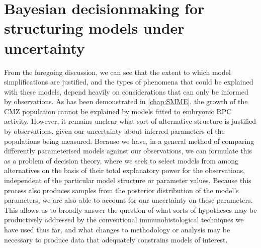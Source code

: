 \section{Bayesian decisionmaking for structuring models under uncertainty}
From the foregoing discussion, we can see that the extent to which model simplifications are justified, and the types of phenomena that could be explained with these models, depend heavily on considerations that can only be informed by observations. As has been demonstrated in \autoref{chap:SMME}, the growth of the CMZ population cannot be explained by models fitted to embryonic RPC activity. However, it remains unclear what sort of alternative structure is justified by observations, given our uncertainty about inferred parameters of the populations being measured. Because we have, in  a general method of comparing differently parameterised models against our observations, we can formulate this as a problem of decision theory, where we seek to select models from among alternatives on the basis of their total explanatory power for the observations, independent of the particular model structure or parameter values. Because this process also produces samples from the posterior distribution of the model's parameters, we are also able to account for our uncertainty on these parameters. This allows us to broadly answer the question of what sorts of hypotheses may be productively addressed by the conventional immunohistological techniques we have used thus far, and what changes to methodology or analysis may be necessary to produce data that adequately constrains models of interest.

